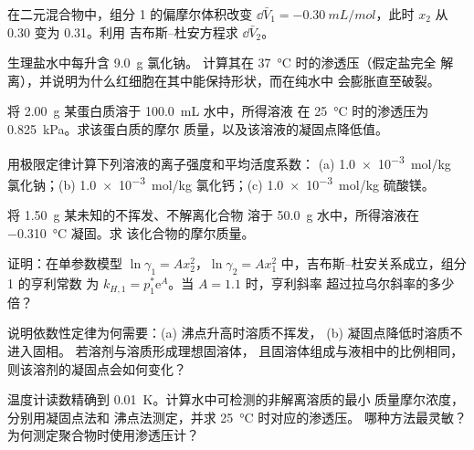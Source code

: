 \begin{exercise}[$\star\star$]\label{exo:b2:chemical-potential:5}
在二元混合物中，组分 1 的偏摩尔体积改变
$\dd\bar V_1 = \qty{-0.30}{mL/mol}$，此时 $x_2$ 从 0.30 变为 0.31。利用
吉布斯–杜安方程求 $\dd\bar V_2$。
\end{exercise}

\begin{exercise}[$\star\star$]\label{exo:b2:chemical-potential:6}
生理盐水中每升含 \qty{9.0}{g} 氯化钠。
计算其在 \qty{37}{\celsius} 时的渗透压（假定盐完全
解离），并说明为什么红细胞在其中能保持形状，而在纯水中
会膨胀直至破裂。
\end{exercise}

\begin{exercise}[$\star\star$]\label{exo:b2:chemical-potential:7}
将 \qty{2.00}{g} 某蛋白质溶于 \qty{100.0}{mL} 水中，所得溶液
在 \qty{25}{\celsius} 时的渗透压为 \qty{0.825}{kPa}。求该蛋白质的摩尔
质量，以及该溶液的凝固点降低值。
\end{exercise}

\begin{exercise}[$\star\star$]\label{exo:b2:chemical-potential:8}
用极限定律计算下列溶液的离子强度和平均活度系数：
(a) \qty{1.0e-3}{mol/kg} 氯化钠；(b) \qty{1.0e-3}{mol/kg}
氯化钙；(c) \qty{1.0e-3}{mol/kg} 硫酸镁。
\end{exercise}

\begin{exercise}[$\star\star$]\label{exo:b2:chemical-potential:9}
将 \qty{1.50}{g} 某未知的不挥发、不解离化合物
溶于 \qty{50.0}{g} 水中，所得溶液在 \qty{-0.310}{\celsius} 凝固。求
该化合物的摩尔质量。
\end{exercise}

\begin{exercise}[$\star\star\star$]\label{exo:b2:chemical-potential:10}
证明：在单参数模型 $\ln\gamma_1 = Ax_2^2$，$\ln\gamma_2 =
Ax_1^2$ 中，吉布斯–杜安关系成立，组分 1 的亨利常数
为 $k_{H,1} = p_1^*\mathrm e^A$。当 $A = 1.1$ 时，亨利斜率
超过拉乌尔斜率的多少倍？
\end{exercise}

\begin{exercise}[$\star\star\star$]\label{exo:b2:chemical-potential:11}
说明依数性定律为何需要：(a) 沸点升高时溶质不挥发，
(b) 凝固点降低时溶质不进入固相。
若溶剂与溶质形成理想固溶体，
且固溶体组成与液相中的比例相同，
则该溶剂的凝固点会如何变化？
\end{exercise}

\begin{exercise}[$\star\star\star$]\label{exo:b2:chemical-potential:12}
温度计读数精确到 \qty{0.01}{K}。计算水中可检测的非解离溶质的最小
质量摩尔浓度，分别用凝固点法和
沸点法测定，并求 \qty{25}{\celsius} 时对应的渗透压。
哪种方法最灵敏？为何测定聚合物时使用渗透压计？
\end{exercise}

